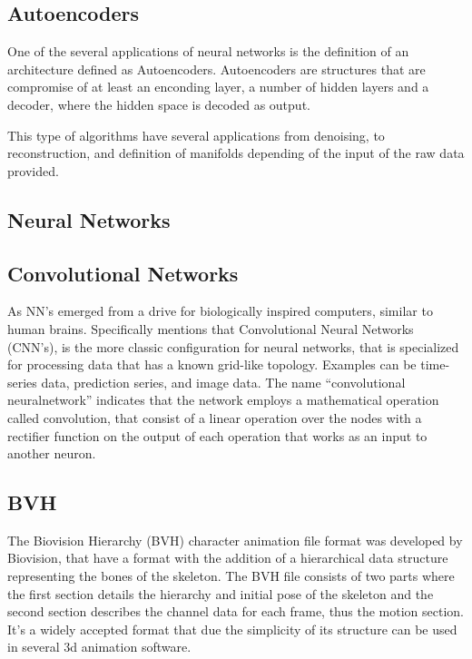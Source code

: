 \subsection{Autoencoders}  \label{subSec:Autoecoders}

One of the several applications of neural networks is the definition of an architecture defined as Autoencoders. Autoencoders are structures that are compromise of at least an enconding layer, a number of hidden layers and a decoder, where the hidden space is decoded as output.

This type of algorithms have several applications from denoising, to reconstruction, and  definition of manifolds depending of the input of the raw data provided. 

\subsection{Neural Networks}  \label{subSec:NeuralNetworks}



\subsection{Convolutional Networks}  \label{subSec:ConvolutionalNetworks}

As \citet{rashid2016make} NN's emerged from a drive for biologically inspired computers, similar to human brains.  
Specifically \citet{Goodfellow-et-al-2016-Book} mentions that Convolutional Neural Networks (CNN's), is the more classic configuration for neural networks, that is specialized 
for processing data that has a known grid-like topology. Examples can be time-series data, prediction series, and image data. 
The name “convolutional neuralnetwork” indicates that the network employs a mathematical operation called convolution, that consist of a linear operation 
over the nodes with a rectifier function on the output of each operation that works as an input to another neuron.


\subsection{BVH}  \label{subSec:BVH}

The Biovision Hierarchy (BVH) character animation file format was developed by Biovision,   
that have a format with the addition of a hierarchical data structure 
representing the bones of the skeleton. The BVH file consists of two parts
where the first section details the hierarchy and initial pose of the skeleton and the second section
describes the channel data for each frame, thus the motion section.
It's a widely accepted format that due the simplicity of its structure can be used in several
3d animation software.

